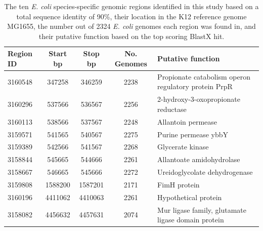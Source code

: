 \documentclass[doublespacing, linenumbers]{bmcart}
\begin{document}
\begin{backmatter}
\newpage
\begin{table}[h!]
\caption{The ten \textit{E. coli} species-specific genomic regions identified in this study based on a total sequence identity of 90\%, their location in the K12 reference genome MG1655, the number out of 2324 \textit{E. coli} genomes each region was found in, and their putative function based on the top scoring BlastX hit.}
\label{tab:specific_location_function}
      \begin{tabular}{lcccl}
        \hline
        Region ID & Start bp & Stop bp & No. Genomes & Putative function\\ 
        \hline
        3160548 & 347258  & 346259  &  2238 & Propionate catabolism operon regulatory protein PrpR\\
        3160296 & 537566  & 536567  &  2256 & 2-hydroxy-3-oxopropionate reductase\\
        3160113 & 538566  & 537567  &  2248 & Allantoin permease\\
        3159571 & 541565  & 540567  &  2275 & Purine permease ybbY\\
        3159389 & 542566  & 541567  &  2268 & Glycerate kinase\\
        3158844 & 545665  & 544666  &  2261 & Allantoate amidohydrolase\\
        3158667 & 546665  & 545666  &  2272 & Ureidoglycolate dehydrogenase\\        
        3159808 & 1588200 & 1587201 &  2171 & FimH protein\\       
        3160196 & 4411062 & 4410063 & 2261 & Hypothetical protein\\
        3158082 & 4456632 & 4457631 &  2074 & Mur ligase family, glutamate ligase domain protein\\
        \hline
      \end{tabular}
\end{table}






\end{backmatter}
\end{document}

